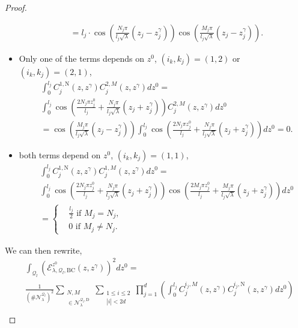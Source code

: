 \documentclass{amsart}
\theoremstyle{definition}
\theoremstyle{remark}
\renewcommand\leq\leqslant
\numberwithin{equation}{section}
\theoremstyle{definition}
\theoremstyle{remark}
\begin{document}
\begin{proof}
\begin{itemize}
\begin{equation}
\begin{aligned}
				&=	l_j\cdot \cos\left(\frac{N_j\pi}{l_j\sqrt{\lambda}}(z_j-z^\gamma_j)\right)\cos\left(\frac{M_j\pi}{l_j\sqrt{\lambda}}(z_j-z^\gamma_j)\right).
			\end{aligned}
		\end{equation} \item Only one of the terms depends on $z^0$, $(i_k,k_j)=(1,2)$ or $(i_k,k_j)=(2,1)$,\begin{equation}
			\begin{aligned}
				&\int_{0}^{l_j}C_j^{1,\mathrm{N}}(z,z^\gamma)C_j^{2,M}(z,z^\gamma)dz^0=	\\&\int_{0}^{l_j}\cos\left(\frac{2N_j\pi z^0_j}{l_j}+\frac{N_j\pi }{l_j\sqrt{\lambda}}(z_j+z^\gamma_j)\right)C_j^{2,M}(z,z^\gamma)dz^0\\
				&=	\cos\left(\frac{M_j\pi}{l_j\sqrt{\lambda}}(z_j-z^\gamma_j)\right)	\int_{0}^{l_j}\cos\left(\frac{2N_j\pi z^0_j}{l_j}+\frac{N_j\pi }{l_j\sqrt{\lambda}}(z_j+z^\gamma_j)\right)dz^0=0.
			\end{aligned}
		\end{equation}
		\item both terms depend on $z^0$, $(i_k,k_j)=(1,1)$,\begin{equation}
			\begin{aligned}
				&\int_{0}^{l_j}C_j^{1,\mathrm{N}}(z,z^\gamma)C_j^{1,M}(z,z^\gamma)dz^0=\\
				&	\int_{0}^{l_j}\cos\left(\frac{2N_j\pi z^0_j}{l_j}+\frac{N_j\pi }{l_j\sqrt{\lambda}}(z_j+z^\gamma_j)\right)\cos\left(\frac{2M_j\pi z^0_j}{l_j}+\frac{M_j\pi }{l_j\sqrt{\lambda}}(z_j+z^\gamma_j)\right)dz^0\\
				&=\left\{\begin{aligned}
					&\frac{l_j}{2}\text{ if }M_j=N_j,\\
					&0\text{ if }M_j\neq N_j.
				\end{aligned}\right.
			\end{aligned}
		\end{equation}
	\end{itemize}
	We can then rewrite, 
	\begin{equation}
		\begin{aligned}
			&\int_{\mathcal{Q}_l}\left(\mathcal{E}_{\lambda,\mathcal{Q}_l,\mathrm{BC}}^{z^0}(z,z^\gamma)\right)^2dz^0=\\&\frac{1}{\left(\#\mathcal{N}_\lambda^{\mathcal{Q}_l}\right)^2}\sum_{\substack{N,M\\ \in\mathcal{N}_\lambda^{\mathcal{Q}_l,\mathrm{D}}}}\sum_{\substack{1\leq i\leq 2\\|i|<2d}} \prod_{j=1}^d\left(\int_{0}^{l_j}C_j^{i_j,M}(z,z^\gamma)C_j^{i_j,\mathrm{N}}(z,z^\gamma)dz^0\right)\\

\end{aligned}
\end{equation}
\end{proof}
\end{document}
